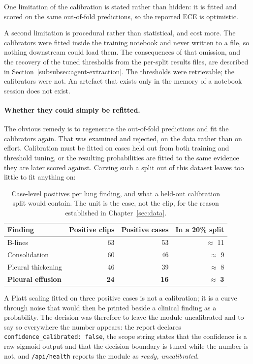 One limitation of the calibration is stated rather than hidden: it is fitted and scored on the
same out-of-fold predictions, so the reported ECE is optimistic.

A second limitation is procedural rather than statistical, and cost more. The calibrators were
fitted inside the training notebook and never written to a file, so nothing downstream could
load them. The consequences of that omission, and the recovery of the tuned thresholds from the
per-split results files, are described in Section~\ref{subsubsec:agent-extraction}. The
thresholds were retrievable; the calibrators were not. An artefact that exists only in the
memory of a notebook session does not exist.

\paragraph{Whether they could simply be refitted.} The obvious remedy is to regenerate the
out-of-fold predictions and fit the calibrators again. That was examined and rejected, on the
data rather than on effort. Calibration must be fitted on cases held out from both training
and threshold tuning, or the resulting probabilities are fitted to the same evidence they are
later scored against. Carving such a split out of this dataset leaves too little to fit
anything on:

\begin{table}[H]
  \centering
  \small
  \begin{tabular}{lrrr}
    \toprule
    \textbf{Finding} & \textbf{Positive clips} & \textbf{Positive cases} &
    \textbf{In a 20\% split} \\
    \midrule
    B-lines             & 63 & 53 & $\approx$ 11 \\
    Consolidation       & 60 & 46 & $\approx$ 9 \\
    Pleural thickening  & 46 & 39 & $\approx$ 8 \\
    \textbf{Pleural effusion} & \textbf{24} & \textbf{16} & $\approx$ \textbf{3} \\
    \bottomrule
  \end{tabular}
  \caption{Case-level positives per lung finding, and what a held-out calibration split would
    contain. The unit is the case, not the clip, for the reason established in
    Chapter~\ref{sec:data}.}
  \label{tab:lung-calibration-budget}
\end{table}

A Platt scaling fitted on three positive cases is not a calibration; it is a curve through
noise that would then be printed beside a clinical finding as a probability. The decision was
therefore to leave the module uncalibrated and to say so everywhere the number appears: the
report declares \texttt{confidence\_calibrated: false}, the scope string states that the
confidence is a raw sigmoid output and that the decision boundary is tuned while the number is
not, and \texttt{/api/health} reports the module as \emph{ready, uncalibrated}.

